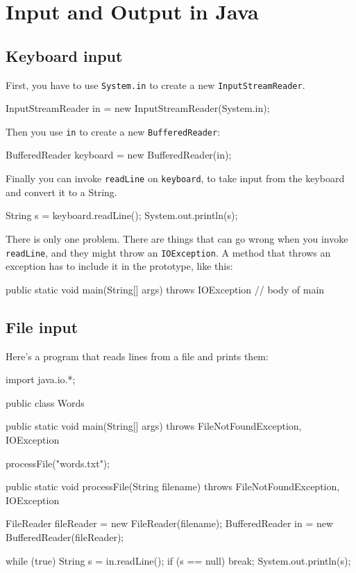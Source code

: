 \chapter{Input and Output in Java}
\label{javaio}

\section{Keyboard input}
\label{keyboard}

First, you have to use {\tt System.in} to create a new
{\tt InputStreamReader}.

\begin{code}
    InputStreamReader in = new InputStreamReader(System.in);
\end{code}

Then you use {\tt in} to create a new {\tt BufferedReader}:

\begin{code}
    BufferedReader keyboard = new BufferedReader(in);
\end{code}

Finally you can invoke {\tt readLine} on {\tt keyboard},
to take input from the keyboard and convert it to a
String.

\begin{code}
    String s = keyboard.readLine();
    System.out.println(s);
\end{code}

There is only one problem.  There are things that can go wrong when
you invoke {\tt readLine}, and they might throw an {\tt IOException}.  A
method that throws an exception has to include it in the
prototype, like this:

\begin{code}
public static void main(String[] args) throws IOException {
    // body of main
}
\end{code}


\section{File input}
\label{fileIO}

Here's a program that reads lines from a file and prints them:

\begin{code}
import java.io.*;

public class Words {

    public static void main(String[] args)
        throws FileNotFoundException, IOException {

        processFile("words.txt");
    }

    public static void processFile(String filename)
        throws FileNotFoundException, IOException {

        FileReader fileReader = new FileReader(filename);
        BufferedReader in = new BufferedReader(fileReader);

        while (true) {
            String s = in.readLine();
            if (s == null) break;
            System.out.println(s);
        }
    }
}
\end{code}

